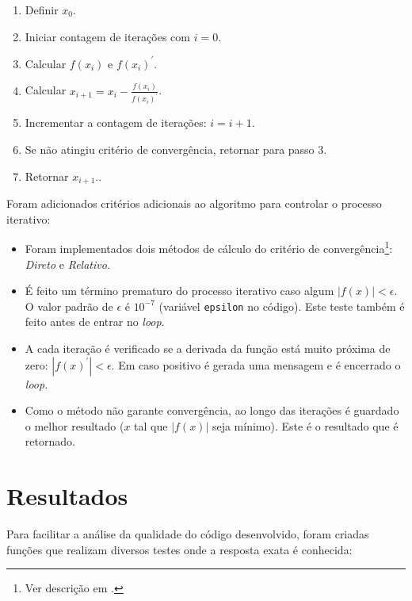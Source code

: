 \documentclass[final,3p,12pt]{elsarticle}
\begin{document}
    \begin{enumerate}
        \item Definir $x_0$.
        \item Iniciar contagem de iterações com $i=0$.
        \item Calcular $f(x_i)$ e $f(x_i)^{\prime}$.
        \item Calcular $x_{i+1} = x_i - \frac{f(x_i)}{f(x_i)^{\prime}}$.
        \item Incrementar a contagem de iterações: $i=i+1$.
        \item Se não atingiu critério de convergência, retornar para passo 3.
        \item Retornar $x_{i+1}.$.
    \end{enumerate}
    
    Foram adicionados critérios adicionais ao algoritmo para controlar o processo iterativo:

    \begin{itemize}
        \item Foram implementados dois métodos de cálculo do critério de convergência\footnote{Ver descrição em \cite{relatoriobisseccao}.}: \emph{Direto} e \emph{Relativo}.
        \item É feito um término prematuro do processo iterativo caso algum $|f(x)| < \epsilon$. O valor padrão de $\epsilon$ é $10^{-7}$ (variável \verb|epsilon| no código). Este teste também é feito antes de entrar no \emph{loop}.
        \item A cada iteração é verificado se a derivada da função está muito próxima de zero: $|f(x)^{\prime}| < \epsilon$. Em caso positivo é gerada uma mensagem e é encerrado o \emph{loop}.
        \item Como o método não garante convergência, ao longo das iterações é guardado o melhor resultado ($x$ tal que $|f(x)|$ seja mínimo). Este é o resultado que é retornado.
    \end{itemize}
    
    \section{Resultados}
    
    Para facilitar a análise da qualidade do código desenvolvido, foram criadas funções que realizam diversos testes onde a resposta exata é conhecida:
\end{document}
